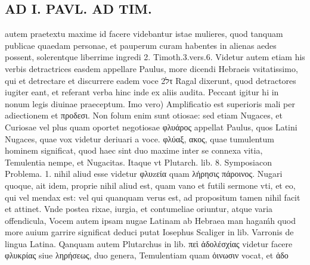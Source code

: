 \documentclass{article}
\begin{document}
\begin{pages}
\section*{AD I. PAVL. AD TIM. }
\marginpar{[ p.286 ]}\pstart autem praetextu maxime id facere videbantur istae mulieres, quod tanquam publicae quaedam personae, et pauperum curam habentes in alienas aedes possent, solerentque liberrime ingredi 2. Timoth.3.vers.6. Videtur autem etiam his verbis detractrices easdem appellare Paulus, more dicendi Hebraeis vsitatissimo, qui et detrectare et discurrere eadem voce 2לτ Ragal dixerunt, quod detractores iugiter eant, et referant verba hinc inde ex aliis audita. Peccant igitur hi in nonum legis diuinae praeceptum. Imo vero) Amplificatio est superioris mali per adiectionem et προδεσι. Non folum enim sunt otiosae: sed etiam Nugaces, et Curiosae vel plus quam oportet negotiosae φλυάρος appellat Paulus, quos Latini Nugaces, quae vox videtur deriuari a voce. φλύαξ, ακος, quae tumulentum hominem significat, quod haec sint duo maxime inter se connexa vitia, Temulentia nempe, et Nugacitas. Itaque vt Plutarch. lib. 8. Symposiacon Problema. 1. nihil aliud esse videtur φλυzεία quam λήρησις πάροινος. Nugari quoque, ait idem, proprie nihil aliud est, quam vano et futili sermone vti, et eo, qui vel mendax est: vel qui quanquam verus est, ad propositum tamen nihil facit et attinet. Vnde postea rixae, iurgia, et contumeliae oriuntur, atque varia offendicula, Vocem autem ipsam nugae Latinam ab Hebraea man hagaḿh quod more auium garrire significat deduci putat Iosephus Scaliger in lib.  Varronis de lingua Latina. Qanquam autem Plutarchus in lib.  πεὶ ἀδολέσχίας videtur facere φλυκρίας siue ληρήσεως, duo genera, Temulentiam quam ὀινωσιν vocat, et ἀδο\pend

\end{pages}
\end{document}
